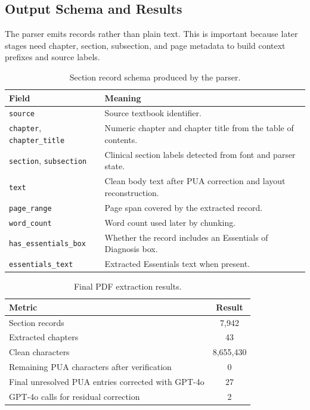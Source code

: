 \subsection{Output Schema and Results}

The parser emits records rather than plain text. This is important because later stages need chapter, section, subsection, and page metadata to build context prefixes and source labels.

\begin{table}[htbp]
\centering
\caption{Section record schema produced by the parser.}
\label{tab:section_schema}
\begin{tabular}{p{} p{}}
\toprule
\textbf{Field} & \textbf{Meaning}\\
\midrule
\texttt{source} & Source textbook identifier.\\
\texttt{chapter}, \texttt{chapter\_title} & Numeric chapter and chapter title from the table of contents.\\
\texttt{section}, \texttt{subsection} & Clinical section labels detected from font and parser state.\\
\texttt{text} & Clean body text after PUA correction and layout reconstruction.\\
\texttt{page\_range} & Page span covered by the extracted record.\\
\texttt{word\_count} & Word count used later by chunking.\\
\texttt{has\_essentials\_box} & Whether the record includes an Essentials of Diagnosis box.\\
\texttt{essentials\_text} & Extracted Essentials text when present.\\
\bottomrule
\end{tabular}
\end{table}

\begin{table}[htbp]
\centering
\caption{Final PDF extraction results.}
\label{tab:pdf_extraction_results}
\begin{tabular}{p{} c}
\toprule
\textbf{Metric} & \textbf{Result}\\
\midrule
Section records & 7,942\\
Extracted chapters & 43\\
Clean characters & 8,655,430\\
Remaining PUA characters after verification & 0\\
Final unresolved PUA entries corrected with GPT-4o & 27\\
GPT-4o calls for residual correction & 2\\
\bottomrule
\end{tabular}
\end{table}

